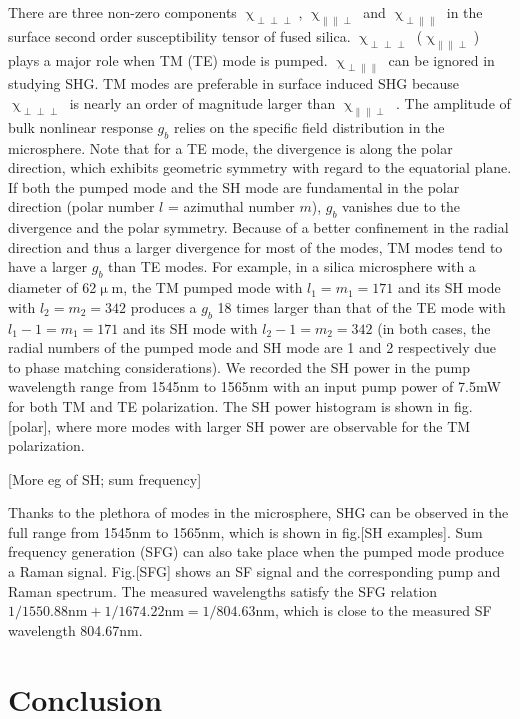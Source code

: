 \documentclass[a4paper,12pt,hyperref]{article}
\begin{document}
There are three non-zero components $\upchi_{\perp \perp \perp}$, $\upchi_{\parallel \parallel \perp}$ and $\upchi_{\perp \parallel \parallel}$ in the surface second order susceptibility tensor of fused silica.  $\upchi_{\perp \perp \perp}$ ($\upchi_{\parallel \parallel \perp}$) plays a major role when TM (TE) mode is pumped. $\upchi_{\perp \parallel \parallel}$ can be ignored in studying SHG. TM modes are preferable in surface induced SHG because $\upchi_{\perp \perp \perp}$ is nearly an order of magnitude larger than $\upchi_{\parallel \parallel \perp}$ \cite{rodriguez2008calibration}. The amplitude of bulk nonlinear response $g_b$ relies on the specific field distribution in the microsphere.  Note that for a TE mode, the divergence is along the polar direction, which exhibits geometric symmetry with regard to the equatorial plane. If both the pumped mode and the SH mode are fundamental in the polar direction (polar number $l$ = azimuthal number $m$), $g_b$ vanishes due to the divergence and the polar symmetry. Because of a better confinement in the radial direction and thus a larger divergence for most of the modes, TM modes tend to have a larger $g_b$ than TE modes. For example, in a silica microsphere with a diameter of 62$\upmu$m, the TM pumped mode with $l_1=m_1=171$ and its SH mode with $l_2=m_2=342$ produces a $g_b$ 18 times larger than that of the TE mode with $l_1-1=m_1=171$ and its SH mode with $l_2-1=m_2=342$ (in both cases, the radial numbers of the pumped mode and SH mode are 1 and 2 respectively due to phase matching considerations). We recorded the SH power in the pump wavelength range from 1545nm to 1565nm with an input pump power of 7.5mW for both TM and TE polarization. The SH power histogram is shown in fig.[polar], where more modes with larger SH power are observable for the TM polarization.


[More eg of SH; sum frequency]

Thanks to the plethora of modes in the microsphere, SHG can be observed in the full range from 1545nm to 1565nm, which is shown in fig.[SH examples]. Sum frequency generation (SFG) can also take place when the pumped mode produce a Raman signal. Fig.[SFG] shows an SF signal and the corresponding pump and Raman spectrum.  The measured wavelengths satisfy the SFG relation $1/1550.88\mathrm{nm} +1/1674.22\mathrm{nm} = 1/804.63\mathrm{nm}$, which is close to the measured SF wavelength 804.67nm.

\section{Conclusion}





\end{document}
